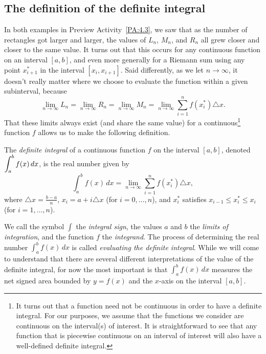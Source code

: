 

\subsection*{The definition of the definite integral} 

In both examples in Preview Activity~\ref{PA:4.3}, we saw that as the number of rectangles got larger and larger, the values of $L_n$, $M_n$, and $R_n$ all grew closer and closer to the same value.  It turns out that this occurs for any continuous function on an interval $[a,b]$, and even more generally for a Riemann sum using any point $x_{i+1}^*$ in the interval $[x_i, x_{i+1}]$.  Said differently, as we let $n \to \infty$, it doesn't really matter where we choose to evaluate the function within a given subinterval, because
$$\lim_{n \to \infty} L_n = \lim_{n \to \infty} R_n = \lim_{n \to \infty} M_n = \lim_{n \to \infty} \sum_{i=1}^{n} f(x_i^*) \triangle x.$$  
That these limits always exist (and share the same value) for a continuous\footnote{It turns out that a function need not be continuous in order to have a definite integral.  For our purposes, we assume that the functions we consider are continuous on the interval(s) of interest.  It is straightforward to see that any function that is piecewise continuous on an interval of interest will also have a well-defined definite integral.} function $f$ allows us to make the following definition.
\begin{definition} \label{D:4.3.DefInt}
The \emph{definite integral} of a continuous function $f$ on the interval $[a,b]$, denoted $\displaystyle \int_a^b f(x) \, dx$, is the real number given by
$$\int_a^b f(x) \, dx = \lim_{n \to \infty} \sum_{i=1}^{n} f(x_i^*) \triangle x,$$
where $\triangle x = \frac{b-a}{n}$, $x_i = a + i\triangle x$ (for $i = 0, \ldots, n$), and $x_i^*$ satisfies $x_{i-1} \le x_i^* \le x_i$ (for $i = 1, \ldots, n$).
\end{definition}
We call the symbol $\int$ the \emph{integral sign}, the values $a$ and $b$ the \emph{limits of integration}, and the function $f$ the \emph{integrand}.  The process of determining the real number $\int_a^b f(x) \, dx$ is called \emph{evaluating the definite integral}.  While we will come to understand that there are several different interpretations of the value of the definite integral, for now the most important is that $\int_a^b f(x) \, dx$ measures the net signed area bounded by $y = f(x)$ and the $x$-axis on the interval $[a,b]$.  
